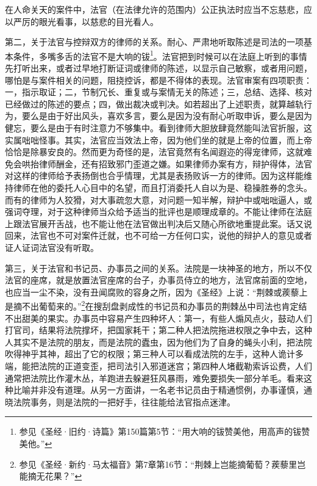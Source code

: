 \par 在人命关天的案件中，法官（在法律允许的范围内）公正执法时应当不忘慈悲，应以严厉的眼光看事，以慈悲的目光看人。
\par 第二，关于法官与控辩双方的律师的关系。耐心、严肃地听取陈述是司法的一项基本条件，多嘴多舌的法官不是大响的钹\footnote{参见《圣经·旧约·诗篇》第150篇第5节：“用大响的钹赞美他，用高声的钹赞美他。”}。法官把到时候可以在法庭上听到的事情先打听出来，或者过早地打断证词或律师的陈述，以显示自己敏察，或者用问题，哪怕是与案件相关的问题，阻挠控诉，都是不得体的表现。法官审案有四项职责：一，指示取证；二，节制冗长、重复或与案情无关的陈述；三，总结、选择、核对已经做过的陈述的要点；四，做出裁决或判决。如若超出了上述职责，就算越轨行为，要么是由于好出风头，喜欢多言，要么是因为没有耐心听取申诉，要么是因为健忘，要么是由于有时注意力不够集中。看到律师大胆放肆竟然能叫法官折服，这实属咄咄怪事。其实，法官应当效法上帝，因为他们坐的就是上帝的位置，而上帝恰恰是除暴安良的。然而更为奇怪的是，法官竟然有名闻遐迩的得宠律师，这就难免会哄抬律师酬金，还有招致邪门歪道之嫌。如果律师办案有方，辩护得体，法官对这样的律师给予表扬倒也合乎情理，尤其是表扬败诉一方的律师。因为这样能维持律师在他的委托人心目中的名望，而且打消委托人自以为是、稳操胜券的念头。而有的律师为人狡猾，对大事疏忽大意，对问题一知半解，辩护中或咄咄逼人，或强词夺理，对于这种律师当众给予适当的批评也是顺理成章的。不能让律师在法庭上跟法官展开舌战，也不能让他在法官做出判决后又随心所欲地重提此案。话又说回来，法官也不可对案件迁就，也不可给一方任何口实，说他的辩护人的意见或者证人证词法官没有听取。
\par 第三，关于法官和书记员、办事员之间的关系。法院是一块神圣的地方，所以不仅法官的座席，就是放置法官座席的台子，办事员侍立的地方，法官席前面的空地，也应当一尘不染，没有丑闻腐败的容身之所，因为《圣经》上说：“荆棘或蒺藜上是摘不出葡萄来的。”\footnote{参见《圣经·新约·马太福音》第7章第16节：“荆棘上岂能摘葡萄？蒺藜里岂能摘无花果？”}在搜刮盘剥成性的书记员和办事员的荆棘丛中司法也肯定结不出甜美的果实。办事员中容易产生四种坏人：第一，有些人煽风点火，鼓动人们打官司，结果将法院撑坏，把国家耗干；第二种人把法院拖进权限之争中去，这种人其实不是法院的朋友，而是法院的蠹虫，因为他们为了自身的蝇头小利，把法院吹得神乎其神，超出了它的权限；第三种人可以看成法院的左手，这种人诡计多端，能把法院的正道变歪，把司法引入邪道迷宫；第四种人堵截勒索诉讼费，人们通常把法院比作灌木丛，羊跑进去躲避狂风暴雨，难免要损失一部分羊毛。看来这种比喻并非没有道理。从另一方面讲，一名老书记员由于精通惯例，办事谨慎，通晓法院事务，则是法院的一把好手，往往能给法官指点迷津。
